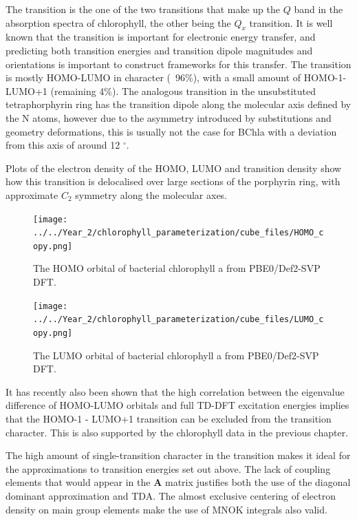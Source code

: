 The \Qy transition is the one of the two transitions that make up the $Q$ band in
the absorption spectra of chlorophyll, the other being the $Q_x$ transition. It 
is well known that the \Qy transition is important for electronic energy transfer,
and predicting both transition energies and transition dipole magnitudes and orientations
is important to construct frameworks for this transfer. The \Qy transition is mostly
HOMO-LUMO in character (~96\%), with a small amount of HOMO-1- LUMO+1 (remaining 4\%).
The analogous transition in the unsubstituted tetraphorphyrin ring has the transition
dipole along the molecular axis defined by the N atoms, however due to the asymmetry 
introduced by substitutions and geometry deformations, this is usually not the case 
for BChla with a deviation from this axis of around 12 $^{\circ}$.

Plots of the electron density of the HOMO, LUMO and transition density show how
this transition is delocalised over large sections of the porphyrin ring, with 
approximate $C_2$ symmetry along the molecular axes.

\begin{figure}
    \centering
    \texttt{[image: ../../Year\_2/chlorophyll\_parameterization/cube\_files/HOMO\_copy.png]}
    \caption{The HOMO orbital of bacterial chlorophyll a from PBE0/Def2-SVP DFT.}
    \label{fig:HOMO}
\end{figure}

\begin{figure}
    \centering
    \texttt{[image: ../../Year\_2/chlorophyll\_parameterization/cube\_files/LUMO\_copy.png]}
    \caption{The LUMO orbital of bacterial chlorophyll a from PBE0/Def2-SVP DFT.}
\end{figure}

It has recently also been shown that the high correlation between the eigenvalue
difference of HOMO-LUMO orbitals and full TD-DFT excitation energies implies that
the HOMO-1 - LUMO+1 transition can be excluded from the transition character. This
is also supported by the chlorophyll data in the previous chapter.

The high amount of single-transition character in the \Qy transition makes it ideal
for the approximations to transition energies set out above. The lack of coupling
elements that would appear in the $\mathbf{A}$ matrix justifies both the use of
the diagonal dominant approximation and TDA. The almost exclusive centering of
electron density on main group elements make the use of MNOK integrals also valid.

